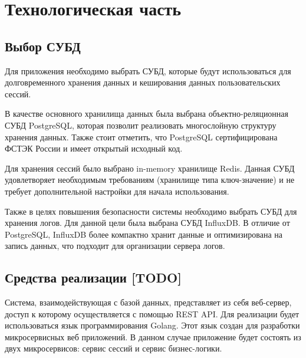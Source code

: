 \section{Технологическая часть}


\subsection{Выбор СУБД}


Для приложения необходимо выбрать СУБД, которые будут использоваться для долговременного хранения данных и кеширования данных пользовательских сессий.

В качестве основного хранилища данных была выбрана объектно-реляционная СУБД PostgreSQL, которая позволит реализовать многослойную структуру хранения данных. Также стоит отметить, что PostgreSQL сертифицирована ФСТЭК России и имеет открытый исходный код.

Для хранения сессий было выбрано in-memory хранилище Redis. Данная СУБД удовлетворяет необходимым требованиям (хранилище типа ключ-значение) и не требует дополнительной настройки для начала использования.

Также в целях повышения безопасности системы необходимо выбрать СУБД для хранения логов. Для данной цели была выбрана СУБД InfluxDB. В отличие от PostgreSQL, InfluxDB более компактно хранит данные и оптимизирована на запись данных, что подходит для организации сервера логов.



\subsection{Средства реализации [TODO]}

Система, взаимодействующая с базой данных, представляет из себя веб-сервер, доступ к которому осуществляется с помощью REST API. Для реализации будет использоваться язык программирования Golang. Этот язык создан для разработки микросервисных веб приложений. В данном случае приложение будет состоять из двух микросервисов: сервис сессий и сервис бизнес-логики. 

